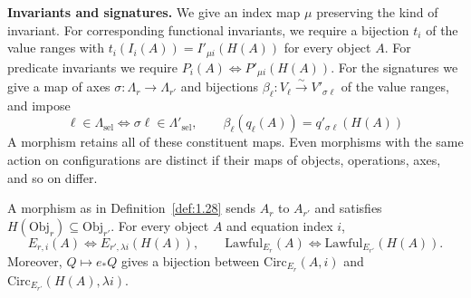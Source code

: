 \begin{definition}
\textbf{Invariants and signatures.}
We give an index map $\mu$ preserving the kind of invariant.
For corresponding functional invariants, we require a bijection $t_i$ of the
value ranges with $t_i(I_i(A))=I'_{\mu i}(H(A))$ for every object $A$.
For predicate invariants we require
$P_i(A)\Longleftrightarrow P'_{\mu i}(H(A))$.
For the signatures we give a map of axes $\sigma:\Lambda_r\to\Lambda_{r'}$ and
bijections $\beta_\ell:V_\ell\xrightarrow{\sim}V'_{\sigma\ell}$ of the value
ranges, and impose
\begin{equation*}
\ell\in\Lambda_{\mathrm{sel}}
\Longleftrightarrow \sigma\ell\in\Lambda'_{\mathrm{sel}},
\qquad
\beta_\ell(q_\ell(A))=q'_{\sigma\ell}(H(A))
\tag{1.11}\label{eq:1.11}
\end{equation*}
A morphism retains all of these constituent maps.
Even morphisms with the same action on configurations are distinct if their
maps of objects, operations, axes, and so on differ.

\end{definition}

\begin{proposition}\label{prop:1.29}

A morphism as in Definition~\ref{def:1.28} sends $A_r$ to $A_{r'}$ and
satisfies $H(\mathrm{Obj}_r)\subseteq\mathrm{Obj}_{r'}$.
For every object $A$ and equation index $i$,
\begin{equation*}
E_{r,i}(A)\Longleftrightarrow E_{r',\lambda i}(H(A)),
\qquad
\mathrm{Lawful}_{E_r}(A)\Longleftrightarrow
\mathrm{Lawful}_{E_{r'}}(H(A)).
\tag{1.12}\label{eq:1.12}
\end{equation*}
Moreover, $Q\mapsto e_*Q$ gives a bijection between
$\mathrm{Circ}_{E_r}(A,i)$ and $\mathrm{Circ}_{E_{r'}}(H(A),\lambda i)$.

\end{proposition}

